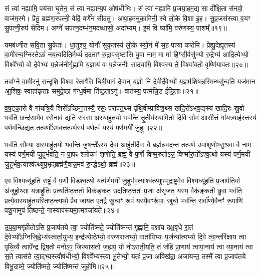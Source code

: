सं त्वा॑ नह्यामि॒ पय॑सा घृ॒तेन॒ सं त्वा॑ नह्याम्य॒प ओष॑धीभिः। सं त्वा॑ नह्यामि प्र॒जया॒हम॒द्य सा दी᳚क्षि॒ता स॑नवो॒ वाज॑म॒स्मे। प्रैतु॒ ब्रह्म॑ण॒स्पत्नी॒ वेदिं॒ वर्णे॑न सीदतु। अथा॒हम॑नुका॒मिनी॒ स्वे लो॒के वि॒शा इ॒ह। सु॒प्र॒जस॑स्त्वा व॒यꣳ सु॒पत्नी॒रुप॑ सेदिम। अग्ने॑ सपत्न॒दम्भ॑न॒मद॑ब्धासो॒ अदा᳚भ्यम्। इ॒मं वि ष्या॑मि॒ वरु॑णस्य॒ पाशम्᳚॥१९॥

यमब॑ध्नीत सवि॒ता सु॒केतः॑। धा॒तुश्च॒ योनौ॑ सुकृ॒तस्य॑ लो॒के स्यो॒नं मे॑ स॒ह पत्या॑ करोमि। प्रेह्यु॒देह्यृ॒तस्य॑ वा॒मीरन्व॒ग्निस्ते\-ऽग्रं॑ नय॒त्वदि॑ति॒र्मध्यं॑ ददताꣳ रु॒द्राव॑सृष्टासि यु॒वा नाम॒ मा मा॑ हिꣳसी॒र्वसु॑भ्यो रु॒द्रेभ्य॑ आदि॒त्येभ्यो॒ विश्वे᳚भ्यो वो दे॒वेभ्यः॑ प॒न्नेज॑नीर्गृह्णामि य॒ज्ञाय॑ वः प॒न्नेज॑नीः सादयामि॒ विश्व॑स्य ते॒ विश्वा॑वतो॒ वृष्णि॑यावतः॥२०॥

तवा᳚ग्ने वा॒मीरनु॑ स॒न्दृशि॒ विश्वा॒ रेताꣳ॑सि धिषी॒यागं॑ दे॒वान् य॒ज्ञो नि दे॒वीर्दे॒वेभ्यो॑ य॒ज्ञम॑शिषन्न॒स्मिन्थ्सु॑न्व॒ति यज॑मान आ॒शिषः॒ स्वाहा॑कृताः समुद्रे॒ष्ठा ग॑न्ध॒र्वमा ति॑ष्ठ॒ता\-ऽनु॑। वात॑स्य॒ पत्म॑न्नि॒ड ई॑डि॒ताः॥२१॥

{\anuvakamend[{पाशं॒ वृष्णि॑यावतस्त्रि॒ꣳ॒शच्च॑}]}%

व॒ष॒ट्का॒रो वै गा॑यत्रि॒यै शिरो᳚\-ऽच्छिन॒त्तस्यै॒ रसः॒ परा॑पत॒थ्स पृ॑थि॒वीम्प्रावि॑श॒थ्स ख॑दि॒रो॑\-ऽभव॒द्यस्य॑ खादि॒रः स्रु॒वो भव॑ति॒ छन्द॑सामे॒व रसे॒नाव॑ द्यति॒ सर॑सा अ॒स्याहु॑तयो भवन्ति तृ॒तीय॑स्यामि॒तो दि॒वि सोम॑ आसी॒त्तं गा॑य॒त्र्याह॑र॒त्तस्य॑ प॒र्णम॑च्छिद्यत॒ तत्प॒र्णो॑\-ऽभव॒त्तत्प॒र्णस्य॑ पर्ण॒त्वं यस्य॑ पर्ण॒मयी॑ जु॒हूः॥२२॥

भव॑ति सौ॒म्या अ॒स्याहु॑तयो भवन्ति जु॒षन्ते᳚\-ऽस्य दे॒वा आहु॑तीर्दे॒वा वै ब्रह्म॑न्नवदन्त॒ तत्प॒र्ण उपा॑शृणोथ्सु॒श्रवा॒ वै नाम॒ यस्य॑ पर्ण॒मयी॑ जु॒हूर्भव॑ति॒ न पा॒पꣴ श्लोकꣳ॑ शृणोति॒ ब्रह्म॒ वै प॒र्णो विण्म॒रुतो\-ऽन्नं॒ विण्मा॑रु॒तो᳚\-ऽश्व॒त्थो यस्य॑ पर्ण॒मयी॑ जु॒हूर्भव॒त्याश्व॑त्थ्युप॒भृद्ब्रह्म॑णै॒वान्न॒मव॑ रु॒न्द्धे\-ऽथो॒ ब्रह्म॑॥२३॥

ए॒व वि॒श्यध्यू॑हति रा॒ष्ट्रं वै प॒र्णो विड॑श्व॒त्थो यत्प॑र्ण॒मयी॑ जु॒हूर्भव॒त्याश्व॑त्थ्युप॒भृद्रा॒ष्ट्रमे॒व वि॒श्यध्यू॑हति प्र॒जाप॑ति॒र्वा अ॑जुहो॒थ्सा यत्राहु॑तिः प्र॒त्यति॑ष्ठ॒त्ततो॒ विक॑ङ्कत॒ उद॑तिष्ठ॒त्ततः॑ प्र॒जा अ॑सृजत॒ यस्य॒ वैक॑ङ्कती ध्रु॒वा भव॑ति॒ प्रत्ये॒वास्याहु॑तयस्तिष्ठ॒न्त्यथो॒ प्रैव जा॑यत ए॒तद्वै स्रु॒चाꣳ रू॒पं यस्यै॒वꣳरू॑पाः॒ स्रुचो॒ भव॑न्ति॒ सर्वा᳚ण्ये॒वैनꣳ॑ रू॒पाणि॑ पशू॒नामुप॑ तिष्ठन्ते॒ नास्याप॑रूपमा॒त्मञ्जा॑यते॥२४॥

{\anuvakamend[{जु॒हूरथो॒ ब्रह्म॑ स्रु॒चाꣳ स॒प्तद॑श च}]}%

उ॒प॒या॒मगृ॑हीतो\-ऽसि प्र॒जाप॑तये त्वा॒ ज्योति॑ष्मते॒ ज्योति॑ष्मन्तं गृह्णामि॒ दक्षा॑य दक्ष॒वृधे॑ रा॒तं दे॒वेभ्यो᳚\-ऽग्निजि॒ह्वेभ्य॑\-स्त्वर्ता॒युभ्य॒ इन्द्र॑ज्येष्ठेभ्यो॒ वरु॑णराजभ्यो॒ वाता॑पिभ्यः प॒र्जन्या᳚त्मभ्यो दि॒वे त्वा॒न्तरि॑क्षाय त्वा पृथि॒व्यै त्वापे᳚न्द्र द्विष॒तो मनो\-ऽप॒ जिज्या॑सतो ज॒ह्यप॒ यो नो॑\-ऽराती॒यति॒ तं ज॑हि प्रा॒णाय॑ त्वापा॒नाय॑ त्वा व्या॒नाय॑ त्वा स॒ते त्वास॑ते त्वा॒द्भ्यस्त्वौष॑धीभ्यो॒ विश्वे᳚भ्यस्त्वा भू॒तेभ्यो॒ यतः॑ प्र॒जा अक्खि॑द्रा॒ अजा॑यन्त॒ तस्मै᳚ त्वा प्र॒जाप॑तये विभू॒दाव्ने॒ ज्योति॑ष्मते॒ ज्योति॑ष्मन्तं जुहोमि॥२५॥

